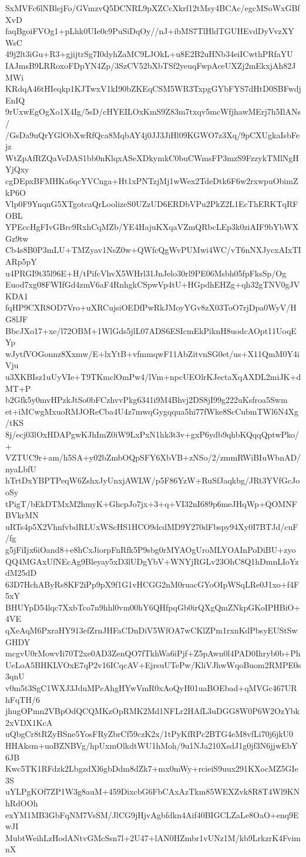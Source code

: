 SxMVFc6lNBlejFo/GVmzvQ5DCNRL9pXZCcXkrf12tMsy4BCAc/egcMSoWxGBfXvD
faqBgoiFVOg1+pLhk0UIe0c9PuSiDqOy//nJ+ibMS7TlHldTGUHEvdDyVvzXYWsC
49j2lt3iGu+R3+gjijtrSg7I0dyhZaMC9LJOkL+u8E2B2uHNb34eiICwthPRfaYU
IAJmsB9LRRoxoFDpYN4Zp/3SzCV52bXbTSf2yeuqFwpAceUXZj2mEkxjAh82JMWi
KRdqA46tHIeqkp1KJTwxV1kI90bZKEqCSM5WR3TxpgGYbFYS7dHtD0SBFwdjEnIQ
9rUxwEgOgXo1X4Ig/5sD/cHYEILOxKmS9Z83m7txqv5mcWfjhawMErj7h5IlANs/
/GsDa9uQrYGlObXwRfQca8MqbAY4j0JJ3JiHl09KGWO7z3Xq/9pCXUgkaIsbFejz
WtZpAfRZQaVeDAS1bb0nKlqxASeXDkymkC0buCWmsFP3mzS9FzzykTMlNgHYjQxy
cgDEpxBFMHKa6qcYVCnga+Ht1xPNTzjMj1wWex2TdeDtk6F6w2rxwpuObimZkP6O
Vlp0F9YnqnG5XTgotcaQrLoolizeS0UZzUD6ERDbVPu2PkZ2L1EcThERKTqRFOBL
YPEccHgFIvGBrc9RxhCqMZb/YE4HajuKXqaVZmQRbcLEp3k0ziAIF9bYbWXGz9tw
Cb4s8B0P3mLU+TMZyav1NsZ0w+QWfcQgWvPUMwi4WC/vT6nNXJycxAIxTIARp5pY
u4PRGI9t35l96E+H/tPifcVhvX5WHrl31JnJelo30rl9PE06Msbh05fpFksSp/Og
Euod7xg08FWIfGd4zmV6aF4RnhgkCSpwVp4tU+HGpdhEHZg+qh32gTNV0gJVKDA1
fqHP9CXR8OD7Vro+uXRCujsiOEDfPwRkJMoyYGv8zX03ToO7rjDpa0WyV/HG8lJF
BbcJXo17+xe/l72OBM+1WlGds5jlL07ADS6ESIcmEkPiknH8uodcAOpt11UoqEYp
wJytfVOGonnz8Xxmw/E+lxYtB+vfmmqwF11AbZitvnSG0et/us+X11QmM0Y4iVju
u3XKBIsz1uUyVIe+T9TKmclOmPw4/lVm+npcUEOlrKJectaXqAXDL2miJK+dMT+P
b2Gfk5y0mvHPzkJtSo0bFCzhvvPkg6341i9M4Bhvj2DS8jI99g222uKsfroa5Swm
et+iMCwgMxuoRMJOReCba4U4z7mwqGygqqua5hi77fWke8ScCubmTWl6N4Xg/tKS
8j/ecj03lOxHDAPgwKJhImZ0iW9LxPxN1hk3t3v+gxP6ydb9qhbKQqqQptwPko/+
VZTUC9r+am/h5SA+y02bZmbOQpSFY6XbVB+zNSo/2/zmmRWiBIuWbnAD/nyaLbfU
hTrtDxYBPTPeqW6ZshxJyUnxjAWLW/p5F86YzW+RuSfJaqkbg/JRt3YVfGcJooSy
tPigT/bEkDTMxM2hmyK+GhcpJo7jx+3+q+VI32nI689p6meJHqWp+QOMNFBVkrMN
uRTs4p5X2VhnfvbdRLUxWScHS1HCO9dcdMD9Y270dFbspy94Xy0I7BTJd/cuF/fg
g5jFiIjx6iOand8+e8hCxJiorpFnRfk5P9sbg0rMYAOgUroMLYOAInPoDiBU+zyo
QQ4MGAxUfNEcAg9Bleyay5xD3lUDgYbV+WNYjRGLv23OhC8Q1hDmnLIoYzdM25dD
63D7HchAByRs8KF2iPp9pX9f1G1vHCGG2nM0ruacGYoOIpWSqLRe0J1xo+f4F5xY
BHUYpD54lqc7XxbTco7n9hhl0vm00hY6QHfpqGb0irQXgQmZNkpGKoIPHBiO+4VE
qXeAqM6PxraHY913efZrnJHFaCDnDiV5WfOA7wCKlZPm1rxnKdPbsyEUStSwGHDY
mcgvU0rMowvIi70T2xe0AD3ZenQO7fTkhWa6iPjf+Z5pAwn0l4PAD0Ihryb0b+Ph
UeLoA5BHKLVOxE7qP2v16ICqcAV+EjrsuUTePw/KliVJhwWqoBuom2RMPE0s3qnU
v0m5t3SgC1WXJ3JduMPcAhgHYwVmR0xAoQyH01uaBOEbad+qMVGc467URhFqTH/6
jhugOPmn2VBpOdQCQMKzOpRMK2Md1NFLr2HAfL3uDGG8W0P6W2OzYbk2xVDX1KcA
uQbgCr8tRZyBSne5YosFRyZbrCf59czK2x/1tPyKfRPc2BTG4eM8vfLi70j6jkU0
HHAksm+uoBZNBVg/hpUxmOlkdtWU1hMoh/9u1NJa210XsdJ1g0jf3N6jjwEbY6JB
Kwc5TK1RFdzk2LbgzdXl6gbDdm8dZk7+mx0mWy+rcieiS9uux291KXocMZ5GIe3S
uYLPgKOf7ZP1W3g8auM+459DixcbG6FbCAxAzTkm85WEXZvk8R8T4Wl9KNhRdOOh
exYM1MB3GbFqNM7VsSM/JlCG9jHjvAgbfdkn4Aif40BIGCLZaLe8OaO+enq9EwJI
MubtWeihLzHodANtvGMcSsn7l+2U47+lAN0HZmbr1vUNz1M/kb9LrkzrK4FvimnX
